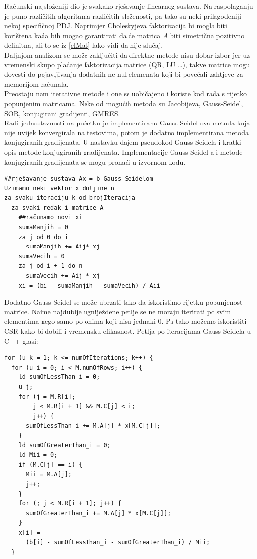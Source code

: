 \documentclass[zavrsnirad]{../fer}
\begin{document}
Računski najsloženiji dio je svakako rješavanje linearnog 
sustava. Na raspolaganju je puno različitih algoritama različitih 
složenosti, pa tako su neki prilagođeniji nekoj specifičnoj PDJ.
Naprimjer Choleskyjeva faktorizacija bi mogla biti korištena kada
bih mogao garantirati da će matrica $A$ biti simetrična pozitivno 
definitna, ali to se iz \ref{elMat} 
lako vidi da nije slučaj.
\bigskip
\\ 
Daljnjom analizom se može zaključiti da direktne metode nisu dobar
izbor jer uz vremenski skupo plaćanje faktorizacija matrice (QR, LU \dots),
takve matrice mogu dovesti do pojavljivanja dodatnih ne nul elemenata 
koji bi povećali zahtjeve za memorijom računala.
\bigskip
\\ 
Preostaju nam iterativne metode i one se uobičajeno i koriste kod 
rada s rijetko popunjenim matricama. Neke od mogućih metoda su 
Jacobijeva, Gauss-Seidel, SOR, konjugirani gradijenti, GMRES.
\bigskip
\\
Radi jednostavnosti na početku je implementirana Gauss-Seidel-ova metoda 
koja nije uvijek konvergirala na testovima, potom je dodatno implementirana 
metoda konjugiranih gradijenata.
U nastavku dajem pseudokod Gauss-Seidela i kratki 
opis metode konjugiranih gradijenata. Implementacije Gauss-Seidel-a i
metode konjugiranih gradijenata se mogu pronaći u izvornom kodu.
\begin{verbatim}
##rješavanje sustava Ax = b Gauss-Seidelom
Uzimamo neki vektor x duljine n
za svaku iteraciju k od brojIteracija
  za svaki redak i matrice A
    ##računamo novi xi
    sumaManjih = 0
    za j od 0 do i 
      sumaManjih += Aij* xj
    sumaVecih = 0
    za j od i + 1 do n
      sumaVecih += Aij * xj
    xi = (bi - sumaManjih - sumaVecih) / Aii 
\end{verbatim}
Dodatno Gauss-Seidel se može ubrzati tako da iskoristimo rijetku popunjenost
matrice. Naime najdublje ugniježdene petlje se ne moraju iterirati po svim elementima
nego samo po onima koji nisu jednaki $0$. Pa tako možemo iskoristiti CSR kako
bi dobili i vremensku efikasnost. Petlja po iteracijama Gauss-Seidela u C++ glasi:
\begin{verbatim}
for (u k = 1; k <= numOfIterations; k++) {
  for (u i = 0; i < M.numOfRows; i++) {
    ld sumOfLessThan_i = 0;
    u j;
    for (j = M.R[i];
        j < M.R[i + 1] && M.C[j] < i;
        j++) {
      sumOfLessThan_i += M.A[j] * x[M.C[j]];
    }
    ld sumOfGreaterThan_i = 0;
    ld Mii = 0;
    if (M.C[j] == i) {
      Mii = M.A[j];
      j++;
    } 
    for (; j < M.R[i + 1]; j++) {
      sumOfGreaterThan_i += M.A[j] * x[M.C[j]];
    }
    x[i] = 
      (b[i] - sumOfLessThan_i - sumOfGreaterThan_i) / Mii; 
  }
\end{verbatim}
\end{document}
